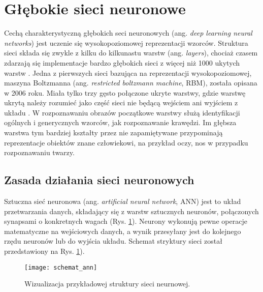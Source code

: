\section{Głębokie sieci neuronowe}

Cechą charakterystyczną głębokich seci neuronowych (ang. \textit{deep learning neural networks}) jest uczenie się wysokopoziomowej reprezentacji wzorców. Struktura sieci składa się zwykle z kilku do kilkunastu warstw (ang. \textit{layers}), chociaż czasem zdarzają się implementacje bardzo głębokich sieci z więcej niż 1000 ukytych warstw \cite{He2015DeepRL}. Jedna z pierwszych sieci bazująca na reprezentacji wysokopoziomowej, maszyna Boltzmanna (ang. \textit{restricted boltzmann machine}, RBM), została opisana w 2006 roku. Miała tylko trzy gęsto połączone ukryte warstwy, gdzie warstwę ukrytą należy rozumieć jako część sieci nie będącą wejściem ani wyjściem z układu \cite{Hinton2006AFL}. W rozpoznawaniu obrazów początkowe warstwy służą identyfikacji ogólnych i generycznych wzorców, jak rozpoznawanie krawędzi. Im głębsza warstwa tym bardziej kształty przez nie zapamiętywane przypominają reprezentacje obiektów znane człowiekowi, na przykład oczy, nos w przypadku rozpoznawaniu twarzy.

\subsection{Zasada działania sieci neuronowych}
Sztuczna sieć neuronowa (ang. \textit{artificial neural network}, ANN) jest to układ przetwarzania danych, składający się z warstw sztucznych neuronów, połączonych synapsami o konkretnych wagach (Rys. \ref{fig:ann_visualisation}). Neurony wykonują pewne operacje matematyczne na wejściowych danych, a wynik przesyłany jest do kolejnego rzędu neuronów lub do wyjścia układu. Schemat stryktury sieci został przedstawiony na Rys. \ref{fig:ann_visualisation}).

\begin{figure}[h!]
	\centering
	\centering
		\texttt{[image: schemat\_ann]}	
	\caption{Wizualizacja przykładowej struktury sieci neurnowej.}
	\label{fig:ann_visualisation}
\end{figure}

